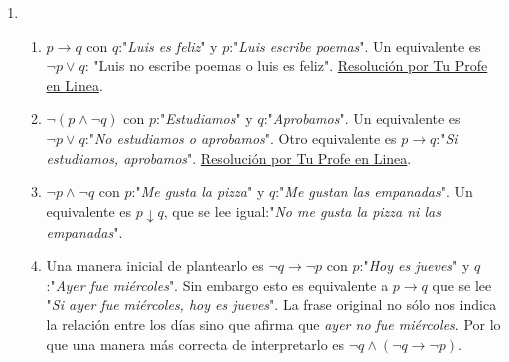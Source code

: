 \documentclass[a4paper]{article}
\newcommand{\exercise}{\item}
\newcommand{\then}{\to}
\begin{document}
\begin{enumerate}
\begin{enumerate} [label=(\alph*)]
		\item No es una proposición. Como $x$ no tiene un valor el enunciado no tendrá un valor de verdad. Este tipo de enunciados los veremos al final de la unidad y se llaman esquemas proposicionales, predicados o enunciados abiertos. Notar que si $x$ fuera un número definido pero desconocido para nosotros sí sería una proposicion con valor de verdad definido (aunque desconocido).
		\item Función exclamativa, no es proposición.
		\item Es complicado. Debemos preguntarnos si hay una afirmación en esta frase. Primero deberíamos reformularla para entender si hay un verbo implicito. "Si alguien te regala un caballo, no deberías mirarle los dientes". Aquí se observa que hay una afirmación sobre si deberíamos mirarle los dientes al caballo o no. Esta afirmación sí es una proposición pero puede ser verdadera o falsa. Si nuestra interpretación de la frase es una órden como "Si te regalan un caballo, no le mires los dientes" esta oración no será una proposición, notar que se pierde el verbo \textit{deberías}. El hecho de que no haya una respuesta clara y correcta sobre este ejercicio muestra que la lógica esta limitada a la interpretación previa del lenguaje.
\end{enumerate}\exercise\begin{enumerate} [label=(\alph*)]		\item $p \then q$ con $q$:"\textit{Luis es feliz}" y $p$:"\textit{Luis escribe poemas}". Un equivalente es $\neg p \lor q$: "Luis no escribe poemas o luis es feliz". \href{https://youtu.be/HXzyX5XGPp8?t=374}{Resolución por Tu Profe en Linea}.
		\item $\neg (p \land \neg q)$ con $p$:"\textit{Estudiamos}" y $q$:"\textit{Aprobamos}". Un equivalente es $\neg p \lor q$:"\textit{No estudiamos o aprobamos}". Otro equivalente es $p \then q$:"\textit{Si estudiamos, aprobamos}". \href{https://youtu.be/HXzyX5XGPp8}{Resolución por Tu Profe en Linea}.
		\item $\neg p  \land  \neg q$ con $p$:"\textit{Me gusta la pizza}" y $q$:"\textit{Me gustan las empanadas}". Un equivalente es $p \downarrow  q$, que se lee igual:"\textit{No me gusta la pizza ni las empanadas}".
		\item Una manera inicial de plantearlo es $\neg q\then \neg p$ con $p$:"\textit{Hoy es jueves}" y $q$:"\textit{Ayer fue miércoles}". Sin embargo esto es equivalente a $p \then q$ que se lee "\textit{Si ayer fue miércoles, hoy es jueves}". La frase original no sólo nos indica la relación entre los días sino que afirma que \textit{ayer no fue miércoles}. Por lo que una manera más correcta de interpretarlo es $\neg q \land (\neg q\then \neg p)$.

\end{enumerate}
\end{enumerate}
\end{document}
